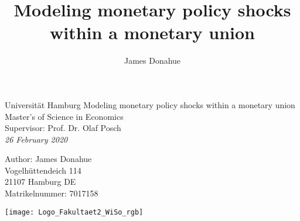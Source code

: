 \documentclass[a4paper, 12pt, oneside]{report}
\author{James Donahue}
\title{Modeling monetary policy shocks within a monetary union}
\begin{document}
\onehalfspacing

\thispagestyle{empty}
\begin{titlepage}
	\begin{center}
		\vspace*{\fill}
		{\Large Universität Hamburg}
		\vfill
		{\Huge Modeling monetary policy shocks within a monetary union }\\ 
		\hfill \break
		\vfill
		Master's of Science in Economics \\
		Supervisor: Prof. Dr. Olaf Posch \\ 
		\textit{26 February 2020}
		\vfill
	\end{center}
	\vfill
	Author: James Donahue \\ 
	Vogelhüttendeich 114 \\ 
	21107 Hamburg DE \\ 
	Matrikelnummer: 7017158\\[2mm]
\begin{center}
	\texttt{[image: Logo\_Fakultaet2\_WiSo\_rgb]}
	\end{center}
\end{titlepage}

\renewcommand{\cftfigpresnum}{Abb. }
\renewcommand{\cfttabpresnum}{Tab. }
\renewcommand{\cftfigaftersnum}{:}
\renewcommand{\cfttabaftersnum}{:}
\setlength{\cftfignumwidth}{2cm}
\setlength{\cfttabnumwidth}{2cm}
\setlength{\cftfigindent}{0cm}
\setlength{\cfttabindent}{0cm}

%
\end{document}
